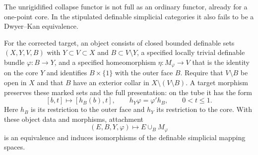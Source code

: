 \begin{proposition}
\label{prop:boundary-bundle-retained-equivalence}
The unrigidified collapse functor is not full as an ordinary functor,
already for a one-point core.  In the stipulated definable simplicial
categories it also fails to be a Dwyer--Kan equivalence.

For the corrected target, an object consists of closed bounded definable sets
$(X,Y,V,B)$ with $Y\subset V\subset X$ and
$B\subset V\setminus Y$, a specified locally trivial definable bundle
$\varphi:B\to Y$, and a specified homeomorphism
$\eta:M_\varphi\to V$ that is the identity on the core $Y$ and
identifies $B\times\{1\}$ with the outer face $B$.
Require that $V\setminus B$ be open in $X$ and that $B$ have an
exterior collar in $X\setminus(V\setminus B)$.
A target morphism preserves these marked sets and the full
presentation: on the tube it has the form
\[
 [b,t]\longmapsto[h_B(b),t],
 \qquad h_Y\varphi=\varphi'h_B,
 \qquad 0<t\leq1.
\]
Here $h_B$ is its restriction to the outer face and $h_Y$ its
restriction to the core.
With these object data and morphisms, attachment
\[
 (E,B,Y,\varphi)\longmapsto E\cup_B M_\varphi
\]
is an equivalence and induces isomorphisms of the definable
simplicial mapping spaces.
\end{proposition}
